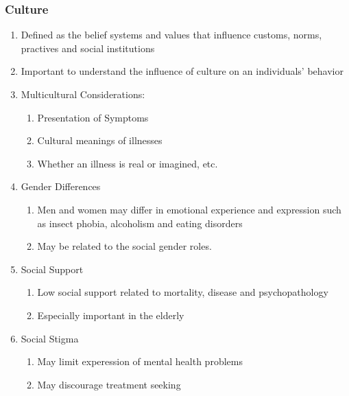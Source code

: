 \documentclass[12pt]{article}
\begin{document}
\subsubsection{Culture}
\begin{enumerate}
\item Defined as the belief systems and values that influence customs,
  norms, practives and social institutions
\item Important to understand the influence of culture on an
  individuals' behavior
\item Multicultural Considerations:
  \begin{enumerate}
  \item Presentation of Symptoms
  \item Cultural meanings of illnesses
  \item Whether an illness is real or imagined, etc.
  \end{enumerate}
\item Gender Differences
  \begin{enumerate}
  \item Men and women may differ in emotional experience and
    expression such as insect phobia, alcoholism and eating disorders
  \item May be related to the social gender roles. 
  \end{enumerate}
\item Social Support
  \begin{enumerate}
  \item Low social support related to mortality, disease and psychopathology
  \item Especially important in the elderly
  \end{enumerate}
\item Social Stigma
  \begin{enumerate}
  \item May limit experession of mental health problems
  \item May discourage treatment seeking
  \end{enumerate}
\end{enumerate}
\end{document}
